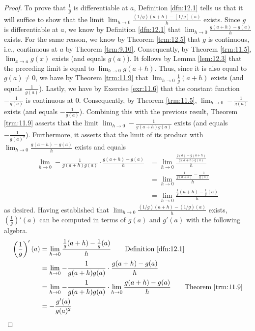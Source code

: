 \documentclass[../main.tex]{subfiles}
\begin{document}
\begin{exercise}
\begin{enumerate}[label={(\alph*)}]
\begin{proof}
            To prove that $\frac{1}{g}$ is differentiable at $a$, Definition \ref{dfn:12.1} tells us that it will suffice to show that the limit $\lim_{h\to 0}\frac{(1/g)(a+h)-(1/g)(a)}{h}$ exists. Since $g$ is differentiable at $a$, we know by Definition \ref{dfn:12.1} that $\lim_{h\to 0}\frac{g(a+h)-g(a)}{h}$ exists. For the same reason, we know by Theorem \ref{trm:12.5} that $g$ is continuous, i.e., continuous at $a$ by Theorem \ref{trm:9.10}. Consequently, by Theorem \ref{trm:11.5}, $\lim_{x\to a}g(x)$ exists (and equals $g(a)$). It follows by Lemma \ref{lem:12.3} that the preceding limit is equal to $\lim_{h\to 0}g(a+h)$. Thus, since it is also equal to $g(a)\neq 0$, we have by Theorem \ref{trm:11.9} that $\lim_{h\to 0}\frac{1}{g}(a+h)$ exists (and equals $\frac{1}{g(a)}$). Lastly, we have by Exercise \ref{exr:11.6} that the constant function $-\frac{1}{g(a)}$ is continuous at 0. Consequently, by Theorem \ref{trm:11.5}, $\lim_{h\to 0}-\frac{1}{g(a)}$ exists (and equals $-\frac{1}{g(a)}$). Combining this with the previous result, Theorem \ref{trm:11.9} asserts that the limit $\lim_{h\to 0}-\frac{1}{g(a+h)g(a)}$ exists (and equals $-\frac{1}{g(a)^2}$). Furthermore, it asserts that the limit of its product with $\lim_{h\to 0}\frac{g(a+h)-g(a)}{h}$ exists and equals
            \begin{align*}
                \lim_{h\to 0}-\frac{1}{g(a+h)g(a)}\cdot\frac{g(a+h)-g(a)}{h} &= \lim_{h\to 0}\frac{\frac{g(a)-g(a+h)}{g(a+h)g(a)}}{h}\\
                &= \lim_{h\to 0}\frac{\frac{1}{g(a+h)}-\frac{1}{g(a)}}{h}\\
                &= \lim_{h\to 0}\frac{\frac{1}{g}(a+h)-\frac{1}{g}(a)}{h}
            \end{align*}
            as desired. Having established that $\lim_{h\to 0}\frac{(1/g)(a+h)-(1/g)(a)}{h}$ exists, $(\frac{1}{g})'(a)$ can be computed in terms of $g(a)$ and $g'(a)$ with the following algebra.
            \begin{align*}
                \left( \frac{1}{g} \right)'(a) &= \lim_{h\to 0}\frac{\frac{1}{g}(a+h)-\frac{1}{g}(a)}{h}\tag*{Definition \ref{dfn:12.1}}\\
                &= \lim_{h\to 0}-\frac{1}{g(a+h)g(a)}\cdot\frac{g(a+h)-g(a)}{h}\\
                &= \lim_{h\to 0}-\frac{1}{g(a+h)g(a)}\cdot\lim_{h\to 0}\frac{g(a+h)-g(a)}{h}\tag*{Theorem \ref{trm:11.9}}\\
                &= -\frac{g'(a)}{g(a)^2}
            \end{align*}

\end{proof}
\end{enumerate}
\end{exercise}
\end{document}
